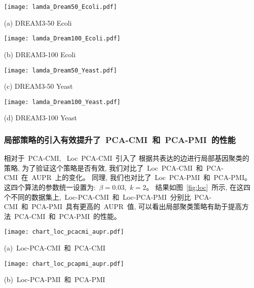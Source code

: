 \begin{figure*}[!htbp]
    \centering
    \begin{minipage}[b]{0.45\linewidth}
      \centering
      \centerline{
        \texttt{[image: lamda\_Dream50\_Ecoli.pdf]}}
      \centerline{(a) DREAM3-50 Ecoli}
      \medskip  
    \end{minipage}
    \begin{minipage}[b]{0.45\linewidth}
      \centering
      \centerline{
        \texttt{[image: lamda\_Dream100\_Ecoli.pdf]}}
      \centerline{(b) DREAM3-100 Ecoli}
      \medskip  
    \end{minipage}
      \begin{minipage}[b]{0.45\linewidth}
      \centering
      \centerline{
        \texttt{[image: lamda\_Dream50\_Yeast.pdf]}}
      \centerline{(c) DREAM3-50 Yeast}
      \medskip  
    \end{minipage}
    \begin{minipage}[b]{0.45\linewidth}
      \centering
      \centerline{
        \texttt{[image: lamda\_Dream100\_Yeast.pdf]}}
      \centerline{(d) DREAM3-100 Yeast}
      \medskip  
    \end{minipage}
    \caption{%
    通过在四个不同的数据集上~$\beta$~逐步改变, 基于~PCA~(路径一致性)~的四个算法的~AUPR~和~AUROC~结果示意图。
    }
    \label{fig:beta}
    \vspace{-0.5em}
\end{figure*}


\subsubsection{局部策略的引入有效提升了~PCA-CMI~和~PCA-PMI~的性能}

相对于~PCA-CMI, ~Loc~PCA-CMI~引入了
根据共表达的边进行局部基因聚类的策略, 为了验证这个策略是否有效, 我们对比了~Loc~PCA-CMI~和~PCA-CMI~在~AUPR~上的变化。
同理, 我们也对比了~Loc~PCA-PMI~和~PCA-PMI。
这四个算法的参数统一设置为:~$\beta = 0.03$,~$k = 2$。
结果如图~\ref{fig:loc}~所示,
在这四个不同的数据集上,~Loc-PCA-CMI~和~Loc-PCA-PMI~分别比~PCA-CMI~和~PCA-PMI~具有更高的~AUPR~值,
可以看出局部聚类策略有助于提高方法~PCA-CMI~和~PCA-PMI~的性能。

\begin{figure*}[!htbp]
  \centering
  \begin{minipage}[b]{0.45\linewidth}
    \centering
    \centerline{
      \texttt{[image: chart\_loc\_pcacmi\_aupr.pdf]}}
    \centerline{(a)~Loc-PCA-CMI~和~PCA-CMI}
    \medskip  
  \end{minipage}
  \begin{minipage}[b]{0.45\linewidth}
    \centering
    \centerline{
      \texttt{[image: chart\_loc\_pcapmi\_aupr.pdf]}}
    \centerline{(b)~Loc-PCA-PMI~和~PCA-PMI}
    \medskip  
  \end{minipage}
    
  \caption{
    局部策略的引入提升了~PCA-CMI~和~PCA-PMI~的性能。
  }
  \label{fig:loc}
  \vspace{-0.5em}
\end{figure*}

